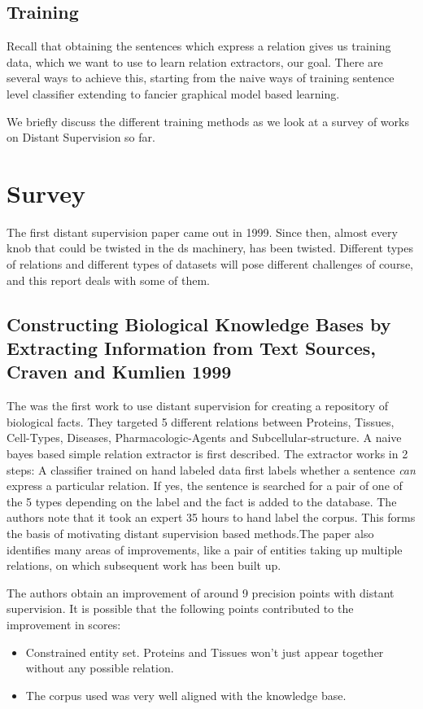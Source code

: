 \documentclass[a4paper,10pt]{article}
\begin{document}
\subsection{Training}
Recall that obtaining the sentences which express a relation gives us training data, which 
we want to use to learn relation extractors, our goal.
There are several ways to achieve this, starting from the naive ways of training sentence 
level classifier extending to fancier graphical model based learning.

We briefly discuss the different training methods as we look at a survey of works on Distant Supervision
so far.

\section{Survey}

The first distant supervision paper came out in 1999.
Since then, almost every knob that could be twisted in the ds machinery, has been 
twisted. Different types of relations and different types of datasets will pose different challenges
of course, and this report deals with some of them.
\subsection{Constructing Biological Knowledge Bases by Extracting Information from Text Sources, Craven and Kumlien 1999}
The was the first work to use distant supervision for creating a repository of biological facts. 
They targeted 5 different relations between Proteins, Tissues, Cell-Types, Diseases, Pharmacologic-Agents and Subcellular-structure.
A naive bayes based simple relation extractor is first described. The extractor works in 2 steps:  A classifier trained on hand labeled data
first labels whether a sentence \emph{can} express a particular relation. If yes, the sentence is searched for a pair of one of the 5 types
depending on the label and the fact is added to the database.
The authors note that it took an expert 35 hours to hand label the corpus. This forms the basis of motivating distant supervision based 
methods.The paper also identifies many areas of improvements, like a pair of entities taking up multiple relations, on which subsequent work has been
built up.

The authors obtain an improvement of around 9 precision points with distant supervision.
It is possible that the following points contributed to the improvement in scores:
\begin{itemize}
 \item Constrained entity set. Proteins and Tissues won't just appear together without any possible relation. 
 \item The corpus used was very well aligned with the knowledge base.
\end{itemize}
\end{document}
